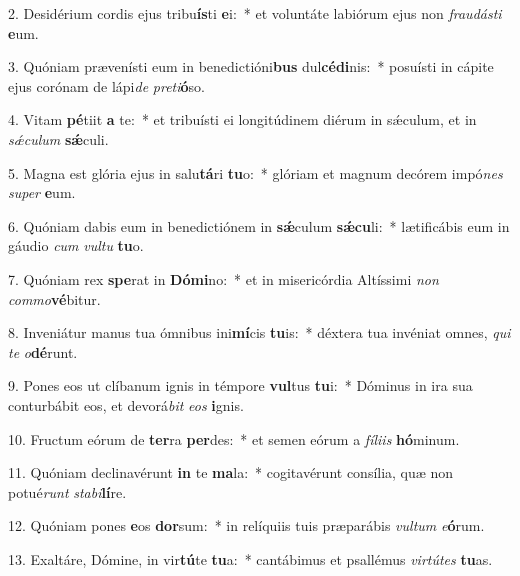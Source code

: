 2. Desidérium cordis ejus tribu\textbf{ís}ti \textbf{e}i:~*  et voluntáte labiórum ejus non \textit{frau}\textit{dás}\textit{ti} \textbf{e}um.\

3. Quóniam prævenísti eum in benedictióni\textbf{bus} dul\textbf{cé}\textbf{di}nis:~*  posuísti in cápite ejus corónam de lápi\textit{de} \textit{pre}\textit{ti}\textbf{ó}so.\

4. Vitam \textbf{pé}tiit \textbf{a} te:~*  et tribuísti ei longitúdinem diérum in sǽculum, et in \textit{sǽ}\textit{cu}\textit{lum} \textbf{sǽ}culi.\

5. Magna est glória ejus in salu\textbf{tá}ri \textbf{tu}o:~*  glóriam et magnum decórem impó\textit{nes} \textit{su}\textit{per} \textbf{e}um.\

6. Quóniam dabis eum in benedictiónem in \textbf{sǽ}culum \textbf{sǽ}\textbf{cu}li:~*  lætificábis eum in gáudio \textit{cum} \textit{vul}\textit{tu} \textbf{tu}o.\

7. Quóniam rex \textbf{spe}rat in \textbf{Dó}\textbf{mi}no:~*  et in misericórdia Altíssimi \textit{non} \textit{com}\textit{mo}\textbf{vé}bitur.\

8. Inveniátur manus tua ómnibus ini\textbf{mí}cis \textbf{tu}is:~*  déxtera tua invéniat omnes, \textit{qui} \textit{te} \textit{o}\textbf{dé}runt.\

9. Pones eos ut clíbanum ignis in témpore \textbf{vul}tus \textbf{tu}i:~*  Dóminus in ira sua conturbábit eos, et devorá\textit{bit} \textit{e}\textit{os} \textbf{i}gnis.\

10. Fructum eórum de \textbf{ter}ra \textbf{per}des:~*  et semen eórum a \textit{fí}\textit{li}\textit{is} \textbf{hó}minum.\

11. Quóniam declinavérunt \textbf{in} te \textbf{ma}la:~*  cogitavérunt consília, quæ non potué\textit{runt} \textit{sta}\textit{bi}\textbf{lí}re.\

12. Quóniam pones \textbf{e}os \textbf{dor}sum:~*  in relíquiis tuis præparábis \textit{vul}\textit{tum} \textit{e}\textbf{ó}rum.\

13. Exaltáre, Dómine, in vir\textbf{tú}te \textbf{tu}a:~*  cantábimus et psallémus \textit{vir}\textit{tú}\textit{tes} \textbf{tu}as.\

